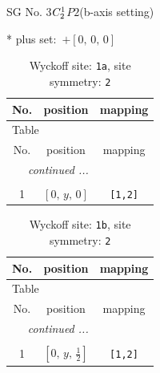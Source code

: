 \documentclass[fleqn,8pt]{jsarticle}
\begin{document}
\setcounter{MaxMatrixCols}{32}

\renewcommand{\tablename}{Table~}
\renewcommand{\figurename}{Figure~}
\begin{center}
\LARGE
SG No. 3\quad$C_{\rm 2}^{1}$\quad$P2$\quad(b-axis setting)\quad[ monoclinic ]
\end{center}
* plus set:\,\,\,$+\left[ 0,\, 0,\, 0 \right]$
\renewcommand{\arraystretch}{1.2}
\begin{longtable}{ccc}
\caption{Wyckoff site: {\tt 1a}, site symmetry: {\tt 2}}
 \\
 \hline \hline
No. & position & mapping \\ \hline \endfirsthead

\multicolumn{2}{l}{\tablename\ \thetable{}} \\
 \hline \hline
No. & position & mapping \\ \hline \endhead

 \hline \hline
\multicolumn{2}{r}{\footnotesize\it continued ...} \\ \endfoot

 \hline \hline
\multicolumn{2}{r}{} \\ \endlastfoot

1 & $\left[ 0,\, y,\, 0 \right]$ & {\tt [1,2]} \\
\end{longtable}
\renewcommand{\arraystretch}{1.2}
\begin{longtable}{ccc}
\caption{Wyckoff site: {\tt 1b}, site symmetry: {\tt 2}}
 \\
 \hline \hline
No. & position & mapping \\ \hline \endfirsthead

\multicolumn{2}{l}{\tablename\ \thetable{}} \\
 \hline \hline
No. & position & mapping \\ \hline \endhead

 \hline \hline
\multicolumn{2}{r}{\footnotesize\it continued ...} \\ \endfoot

 \hline \hline
\multicolumn{2}{r}{} \\ \endlastfoot

1 & $\left[ 0,\, y,\, \frac{1}{2} \right]$ & {\tt [1,2]} \\
\end{longtable}
\renewcommand{\arraystretch}{1.2}
\end{document}
